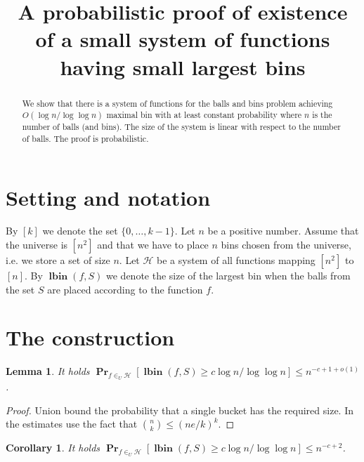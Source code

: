 \documentclass{article}
\title{A probabilistic proof of existence of a small system of functions having small largest bins}
\newcommand{\lbin}[2]{\operatorname{\mathbf{lbin}}({#1}, {#2})}
\newcommand{\probs}[2]{\operatorname{\mathbf{Pr}}_{{#1}}\left[{#2}\right]}
\newtheorem{lemma}{Lemma}
\newtheorem{corollary}{Corollary}
\begin{document}
\maketitle

\begin{abstract}
We show that there is a system of functions for the balls and bins problem achieving $O(\log n/ \log \log n)$ maximal bin with at least constant probability where $n$ is the number of balls (and bins). 
The size of the system is linear with respect to the number of balls.
The proof is probabilistic.
\end{abstract}

\section{Setting and notation}

By $[k]$ we denote the set $\{0, \dots, k - 1\}$. 
Let $n$ be a positive number.
Assume that the universe is $[n^2]$ and that we have to place $n$ bins chosen from the universe, i.e. we store a set of size $n$.
Let $\mathcal{H}$ be a system of all functions mapping $[n^2]$ to $[n]$.
By $\lbin{f}{S}$ we denote the size of the largest bin when the balls from the set $S$ are placed according to the function $f$.

\section{The construction}
\begin{lemma}
It holds $\probs{f\in_U\mathcal{H}}{\lbin f S \geq c \log n / \log \log n} \leq n^{-c + 1 + o(1)}$.
\end{lemma}
\begin{proof}
Union bound the probability that a single bucket has the required size. In the estimates use the fact that ${n \choose k} \leq (ne/k)^k$.
\end{proof}

\begin{corollary}
\label{corollary-single-function}
It holds $\probs{f\in_U\mathcal{H}}{\lbin f S \geq c \log n / \log \log n} \leq n^{-c + 2}$.
\end{corollary}
\end{document}
